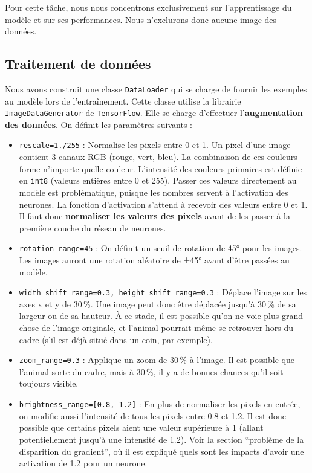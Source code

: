 \documentclass{article}
\begin{document}
Pour cette tâche, nous nous concentrons exclusivement sur l'apprentissage du modèle et sur ses performances. Nous n’exclurons donc aucune image des données.

\subsection{ Traitement de données}

Nous avons construit une classe \texttt{DataLoader} qui se charge de fournir les exemples au modèle lors de l'entraînement. Cette classe utilise la librairie \texttt{ImageDataGenerator} de \texttt{TensorFlow}. Elle se charge d’effectuer l’\textbf{augmentation des données}. On définit les paramètres suivants :

\begin{itemize}
    \item \texttt{rescale=1./255} : Normalise les pixels entre 0 et 1. Un pixel d'une image contient 3 canaux RGB (rouge, vert, bleu). La combinaison de ces couleurs forme n'importe quelle couleur. L'intensité des couleurs primaires est définie en \texttt{int8} (valeurs entières entre 0 et 255). Passer ces valeurs directement au modèle est problématique, puisque les nombres servent à l’activation des neurones. La fonction d'activation s'attend à recevoir des valeurs entre 0 et 1. Il faut donc \textbf{normaliser les valeurs des pixels} avant de les passer à la première couche du réseau de neurones.

    \item \texttt{rotation\_range=45} : On définit un seuil de rotation de 45° pour les images. Les images auront une rotation aléatoire de ±45° avant d’être passées au modèle.

    \item \texttt{width\_shift\_range=0.3, height\_shift\_range=0.3} : Déplace l’image sur les axes x et y de 30\,\%. Une image peut donc être déplacée jusqu’à 30\,\% de sa largeur ou de sa hauteur. À ce stade, il est possible qu’on ne voie plus grand-chose de l’image originale, et l’animal pourrait même se retrouver hors du cadre (s’il est déjà situé dans un coin, par exemple).

    \item \texttt{zoom\_range=0.3} : Applique un zoom de 30\,\% à l’image. Il est possible que l’animal sorte du cadre, mais à 30\,\%, il y a de bonnes chances qu’il soit toujours visible.

    \item \texttt{brightness\_range=[0.8, 1.2]} : En plus de normaliser les pixels en entrée, on modifie aussi l’intensité de tous les pixels entre 0.8 et 1.2. Il est donc possible que certains pixels aient une valeur supérieure à 1 (allant potentiellement jusqu'à une intensité de 1.2). Voir la section ``problème de la disparition du gradient'', où il est expliqué quels sont les impacts d’avoir une activation de 1.2 pour un neurone.


\end{itemize}
\end{document}
